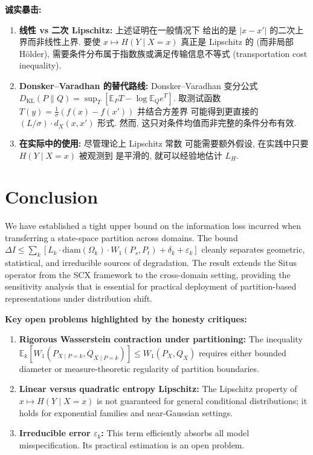 \documentclass[12pt,a4paper]{article}
\newcommand{\E}{\mathbb{E}}
\newcommand{\Wass}{W_1}
\newcommand{\diam}{\mathrm{diam}}
\newcommand{\critique}{\medskip\noindent\textbf{诚实暴击: }}
\begin{document}
\critique
\begin{enumerate}
    \item \textbf{线性 vs 二次 Lipschitz:} 上述证明在一般情况下
          给出的是 $|x-x'|$ 的二次上界而非线性上界. 要使
          $x\mapsto H(Y\mid X=x)$ 真正是 Lipschitz 的 (而非局部
          H\"older), 需要条件分布属于指数族或满足传输信息不等式
          (transportation cost inequality).
    \item \textbf{Donsker--Varadhan 的替代路线:}
          Donsker--Varadhan 变分公式 $D_{\mathrm{KL}}(P\|Q)
          =\sup_T[\E_P T-\log\E_Q e^T]$. 取测试函数
          $T(y)=\frac{1}{\sigma}(f(x)-f(x'))$ 并结合方差界
          可能得到更直接的 $(L/\sigma)\cdot d_X(x,x')$ 形式.
          然而, 这只对条件均值而非完整的条件分布有效.
    \item \textbf{在实际中的使用:} 尽管理论上 Lipschitz 常数
          可能需要额外假设, 在实践中只要 $H(Y\mid X=x)$ 被观测到
          是平滑的, 就可以经验地估计 $L_H$.
\end{enumerate}


\section{Conclusion}

We have established a tight upper bound on the information loss incurred
when transferring a state-space partition across domains.  The bound
$\Delta I \leq \sum_k[L_k\cdot\diam(\Omega_k)\cdot\Wass(P_s,P_t) +
\delta_k + \varepsilon_k]$ cleanly separates geometric, statistical, and
irreducible sources of degradation.  The result extends the Situs operator
from the SCX framework to the cross-domain setting, providing the
sensitivity analysis that is essential for practical deployment of
partition-based representations under distribution shift.

\medskip\noindent
\textbf{Key open problems highlighted by the honesty critiques:}
\begin{enumerate}[label=(\arabic*)]
    \item \textbf{Rigorous Wasserstein contraction under partitioning:}
          The inequality $\E_k[W_1(P_{X\mid P=k}, Q_{X\mid P=k})]
          \leq W_1(P_X, Q_X)$ requires either bounded diameter or
          measure-theoretic regularity of partition boundaries.
    \item \textbf{Linear versus quadratic entropy Lipschitz:}
          The Lipschitz property of $x\mapsto H(Y\mid X=x)$ is
          not guaranteed for general conditional distributions;
          it holds for exponential families and near-Gaussian
          settings.
    \item \textbf{Irreducible error $\varepsilon_k$:} This term
          efficiently absorbs all model misspecification. Its
          practical estimation is an open problem.
\end{enumerate}
\end{document}
